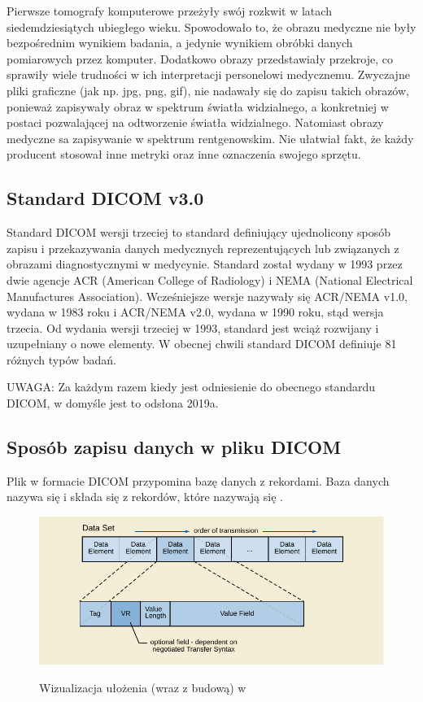 

Pierwsze tomografy komputerowe przeżyły swój rozkwit w latach siedemdziesiątych ubiegłego wieku.
Spowodowało to, że obrazu medyczne nie były bezpośrednim wynikiem badania, a jedynie wynikiem obróbki danych pomiarowych przez komputer.
Dodatkowo obrazy przedstawiały przekroje, co sprawiły wiele trudności w ich interpretacji personelowi medycznemu.
Zwyczajne pliki graficzne (jak np. jpg, png, gif), nie nadawały się do zapisu takich obrazów, ponieważ zapisywały obraz w spektrum światła widzialnego, a konkretniej w postaci pozwalającej na odtworzenie światła widzialnego.
Natomiast obrazy medyczne sa zapisywanie w spektrum rentgenowskim.
Nie ułatwiał fakt, że każdy producent stosował inne metryki oraz inne oznaczenia swojego sprzętu.

\subsection{Standard DICOM v3.0}

Standard DICOM wersji trzeciej to standard definiujący ujednolicony sposób zapisu i przekazywania danych medycznych reprezentujących lub związanych z obrazami diagnostycznymi w medycynie.
Standard został wydany w 1993 przez dwie agencje ACR (American College of Radiology) i NEMA (National Electrical Manufactures Association).
Wcześniejsze wersje nazywały się ACR/NEMA v1.0, wydana w 1983 roku i ACR/NEMA v2.0, wydana w 1990 roku, stąd wersja trzecia.
Od wydania wersji trzeciej w 1993, standard jest wciąż rozwijany i uzupełniany o nowe elementy.
W obecnej chwili standard DICOM definiuje 81 różnych typów badań.

UWAGA: Za każdym razem kiedy jest odniesienie do obecnego standardu DICOM, w domyśle jest to odsłona 2019a.

\subsection{Sposób zapisu danych w pliku DICOM}

Plik w formacie DICOM przypomina bazę danych z rekordami.
Baza danych nazywa się  i składa się z rekordów, które nazywają się .

\begin{figure}[!htbp]
    \caption{Wizualizacja ułożenia (wraz z budową) w }
    \includegraphics[]{img/dicom-dataelement001.pdf}
    \centering
    \label{fig:dicom-dataelement}
\end{figure}

